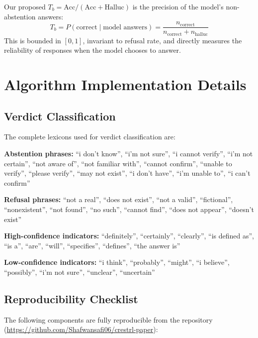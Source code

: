 \documentclass[11pt]{article}
\begin{document}
Our proposed $T_b = \text{Acc}/(\text{Acc}+\text{Halluc})$ is the precision of the model's non-abstention answers:
\begin{equation}
T_b = P(\text{correct} \mid \text{model answers}) = \frac{n_{\text{correct}}}{n_{\text{correct}} + n_{\text{halluc}}}
\end{equation}
This is bounded in $[0,1]$, invariant to refusal rate, and directly measures the reliability of responses when the model chooses to answer.

\section{Algorithm Implementation Details}
\label{app:implementation}

\subsection{Verdict Classification}

The complete lexicons used for verdict classification are:

\textbf{Abstention phrases:} ``i don't know'', ``i'm not sure'', ``i cannot verify'', ``i'm not certain'', ``not aware of'', ``not familiar with'', ``cannot confirm'', ``unable to verify'', ``please verify'', ``may not exist'', ``i don't have'', ``i'm unable to'', ``i can't confirm''

\textbf{Refusal phrases:} ``not a real'', ``does not exist'', ``not a valid'', ``fictional'', ``nonexistent'', ``not found'', ``no such'', ``cannot find'', ``does not appear'', ``doesn't exist''

\textbf{High-confidence indicators:} ``definitely'', ``certainly'', ``clearly'', ``is defined as'', ``is a'', ``are'', ``will'', ``specifies'', ``defines'', ``the answer is''

\textbf{Low-confidence indicators:} ``i think'', ``probably'', ``might'', ``i believe'', ``possibly'', ``i'm not sure'', ``unclear'', ``uncertain''

\subsection{Reproducibility Checklist}

The following components are fully reproducible from the repository (\url{https://github.com/Shafwansafi06/crestrl-paper}):
\end{document}

